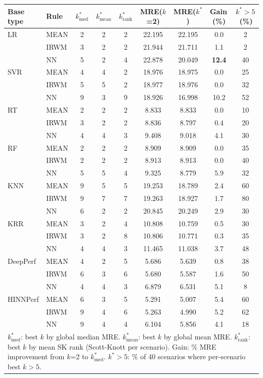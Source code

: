 \begin{tabular}{llccccccc}
\toprule
Base type & Rule & $k^*_{\text{med}}$ & $k^*_{\text{mean}}$ & $k^*_{\text{rank}}$ & MRE($k$=2) & MRE($k^*$) & Gain\,(\%) & $k^*>5$\,(\%) \\
\midrule
LR & MEAN & 2 & 2 & 2 & 22.195 & 22.195 & 0.0 & 2 \\
 & IRWM & 3 & 2 & 2 & 21.944 & 21.711 & 1.1 & 2 \\
 & NN & 5 & 2 & 4 & 22.878 & 20.049 & \textbf{12.4} & 40 \\
\midrule
SVR & MEAN & 4 & 4 & 2 & 18.976 & 18.975 & 0.0 & 25 \\
 & IRWM & 5 & 5 & 2 & 18.977 & 18.976 & 0.0 & 32 \\
 & NN & 9 & 3 & 9 & 18.926 & 16.998 & 10.2 & 52 \\
\midrule
RT & MEAN & 2 & 2 & 2 & 8.833 & 8.833 & 0.0 & 10 \\
 & IRWM & 3 & 2 & 2 & 8.836 & 8.797 & 0.4 & 20 \\
 & NN & 4 & 4 & 3 & 9.408 & 9.018 & 4.1 & 30 \\
\midrule
RF & MEAN & 2 & 2 & 2 & 8.909 & 8.909 & 0.0 & 35 \\
 & IRWM & 2 & 2 & 2 & 8.913 & 8.913 & 0.0 & 40 \\
 & NN & 5 & 5 & 4 & 9.325 & 8.779 & 5.9 & 32 \\
\midrule
KNN & MEAN & 9 & 5 & 5 & 19.253 & 18.789 & 2.4 & 60 \\
 & IRWM & 9 & 7 & 7 & 19.263 & 18.927 & 1.7 & 80 \\
 & NN & 6 & 2 & 2 & 20.845 & 20.249 & 2.9 & 30 \\
\midrule
KRR & MEAN & 3 & 2 & 4 & 10.808 & 10.759 & 0.5 & 30 \\
 & IRWM & 3 & 2 & 8 & 10.806 & 10.771 & 0.3 & 35 \\
 & NN & 4 & 4 & 3 & 11.465 & 11.038 & 3.7 & 48 \\
\midrule
DeepPerf & MEAN & 4 & 2 & 5 & 5.686 & 5.639 & 0.8 & 38 \\
 & IRWM & 6 & 3 & 6 & 5.680 & 5.587 & 1.6 & 50 \\
 & NN & 4 & 4 & 3 & 6.879 & 6.531 & 5.1 & 8 \\
\midrule
HINNPerf & MEAN & 6 & 3 & 5 & 5.291 & 5.007 & 5.4 & 60 \\
 & IRWM & 9 & 4 & 6 & 5.263 & 4.990 & 5.2 & 62 \\
 & NN & 9 & 4 & 4 & 6.104 & 5.856 & 4.1 & 18 \\
\bottomrule
\multicolumn{9}{l}{\footnotesize $k^*_{\text{med}}$: best $k$ by global median MRE. $k^*_{\text{mean}}$: best $k$ by global mean MRE. $k^*_{\text{rank}}$: best $k$ by mean SK rank (Scott-Knott per scenario). Gain: \% MRE improvement from $k$=2 to $k^*_{\text{med}}$. $k^*>5$: \% of 40 scenarios where per-scenario best $k > 5$.} \\
\end{tabular}
